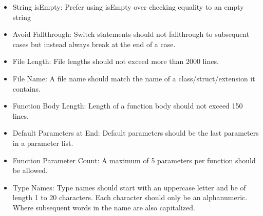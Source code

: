 \documentclass[12pt]{article}
\begin{document}
\begin{itemize}
     \newline
  \item String isEmpty:\newline
    Prefer using isEmpty over checking equality to an empty string \newline
     \newline
  \item Avoid Fallthrough:\newline
    Switch statements should not fallthrough to subsequent cases but instead always break at the end of  \newline
    a case. \newline
     \newline
  \item File Length:\newline
    File lengths should not exceed more than 2000 lines. \newline
     \newline
  \item File Name:\newline
    A file name should match the name of a class/struct/extension it contains. \newline
     \newline
  \item Function Body Length:\newline
    Length of a function body should not exceed 150 lines. \newline
     \newline
  \item Default Parameters at End:\newline
    Default parameters should be the last parameters in a parameter list. \newline
     \newline
  \item Function Parameter Count:\newline
    A maximum of 5 parameters per function should be allowed. \newline
     \newline
  \item Type Names:\newline
    Type names should start with an uppercase letter and be of length 1 to 20 characters. Each \newline
    character should only be an alphanumeric. Where subsequent words in the name are also  \newline
    capitalized. \newline

\end{itemize}
\end{document}
